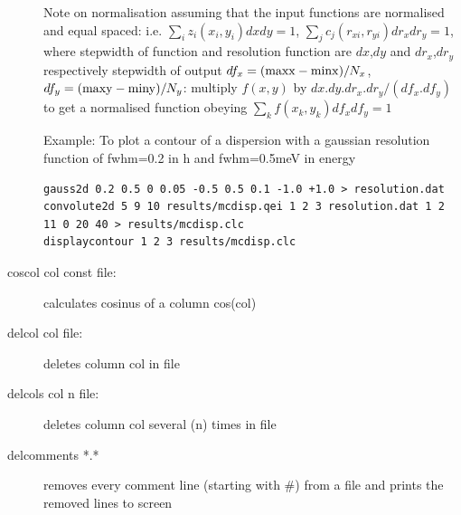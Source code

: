 \begin{description}
Note on normalisation assuming that the input functions are normalised and equal spaced: i.e.
                        $ \sum_i z_i(x_i,y_i) dx dy =1$,  
                        $ \sum_j c_j(r_{xi},r_{yi}) dr_x dr_y =1 $, where     
  stepwidth of function and resolution function are $dx$,$dy$ and $dr_x$,$dr_y$ respectively
  stepwidth of output $df_x=({\rm maxx}-{\rm minx})/N_x$,$df_y=({\rm maxy}-{\rm miny})/N_y$:
                        multiply $f(x,y)$ by $dx.dy.dr_x.dr_y/(df_x.df_y)$ 
     to get a normalised function obeying $\sum_k f(x_k,y_k) df_x df_y = 1$

 Example: To plot a contour of a dispersion with a gaussian resolution function of
          fwhm=0.2 in h and fwhm=0.5meV in energy
\begin{verbatim}
gauss2d 0.2 0.5 0 0.05 -0.5 0.5 0.1 -1.0 +1.0 > resolution.dat
convolute2d 5 9 10 results/mcdisp.qei 1 2 3 resolution.dat 1 2 11 0 20 40 > results/mcdisp.clc
displaycontour 1 2 3 results/mcdisp.clc
\end{verbatim}
\item [\prg coscol\index{coscol}\label{coscol} col const file:] calculates cosinus of a column cos(col) 
\item [\prg delcol\index{delcol}\label{delcol} col file:] deletes column col in file
\item [\prg delcols\index{delcols}\label{delcols} col n file:] deletes column col several (n) times in file
\item [\prg delcomments\index{delcomments}\label{delcomments} *.*] removes every comment line (starting with \#) from a file and %
prints the removed lines to screen

\end{description}
